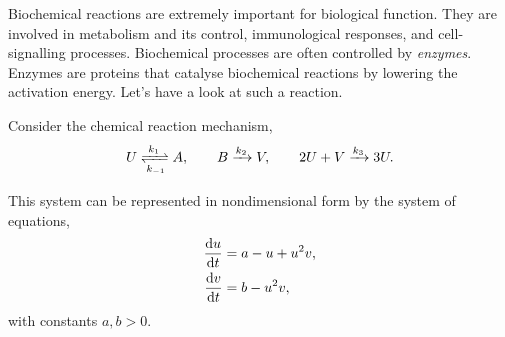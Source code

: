 \documentclass[main.tex]{subfiles}
\begin{document}
%
%

Biochemical reactions are extremely important for biological function. They are
involved in metabolism and its control, immunological responses, and cell-signalling processes. Biochemical processes are often controlled by \emph{enzymes}. Enzymes are proteins that catalyse biochemical reactions by lowering the activation energy. Let's have a look at such a reaction.


Consider the chemical reaction mechanism,
\begin{equation}
	U \xrightleftharpoons[k_{-1}]{k_1} A, \qquad 
	B \xrightarrow{k_2} V, \qquad
	2U+V \xrightarrow{k_3} 3U.	
\end{equation}

This system can be represented in nondimensional form by the system of equations, 
\begin{subequations}
\label{limcyc}
\begin{align}
\fd{u}{t} &= a - u +u^2v,\\
\fd{v}{t} &= b - u^2v,
\end{align}
\end{subequations}
with constants $a,b>0$. %
\end{document}
